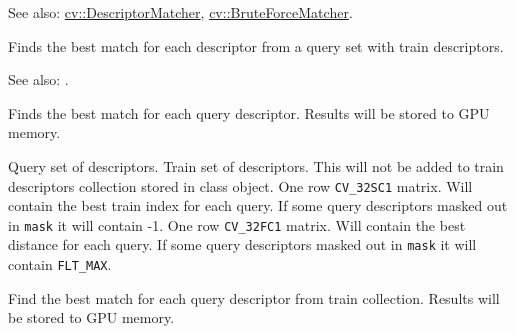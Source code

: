 See also: \hyperref[cv.class.DescriptorMatcher]{cv::DescriptorMatcher}, \hyperref[cv.class.BruteForceMatcher]{cv::BruteForceMatcher}.


\label{cppfunc.gpu.BruteForceMatcher.match}
Finds the best match for each descriptor from a query set with train descriptors.


See also: .


\label{cppfunc.gpu.BruteForceMatcher.matchSingle}
Finds the best match for each query descriptor. Results will be stored to GPU memory.


\begin{description}
 {Query set of descriptors.}
 {Train set of descriptors. This will not be added to train descriptors collection stored in class object.}
 {One row \texttt{CV\_32SC1} matrix. Will contain the best train index for each query. If some query descriptors masked out in \texttt{mask} it will contain -1.}
 {One row \texttt{CV\_32FC1} matrix. Will contain the best distance for each query. If some query descriptors masked out in \texttt{mask} it will contain \texttt{FLT\_MAX}.}
\end{description}


\label{cppfunc.gpu.BruteForceMatcher.matchCollection}
Find the best match for each query descriptor from train collection. Results will be stored to GPU memory.

